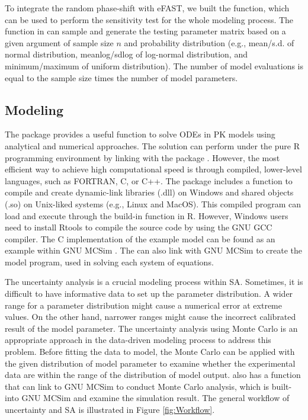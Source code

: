 To integrate the random phase-shift with eFAST, we built the
 function, which can be used to perform the sensitivity
test for the whole modeling process. The function  in
 can sample and generate the testing parameter matrix
based on a given argument of sample size \(n\) and probability
distribution (e.g., mean/s.d. of normal distribution, meanlog/sdlog of
log-normal distribution, and minimum/maximum of uniform distribution).
The number of model evaluations is equal to the sample size times the
number of model parameters.

\hypertarget{modeling}{%
\subsection{Modeling}\label{modeling}}

The  package provides a useful function to solve ODEs
in PK models using analytical and numerical approaches. The solution can
perform under the pure R programming environment by linking
 with the  package \citep{JSSv033i09}.
However, the most efficient way to achieve high computational speed is
through compiled, lower-level languages, such as FORTRAN, C, or C++. The
 package includes a function to compile and create
dynamic-link libraries (.dll) on Windows and shared objects (.so) on
Unix-liked systems (e.g., Linux and MacOS). This compiled program can
load and execute through the build-in function in R. However, Windows
users need to install Rtools to compile the source code by using the GNU
GCC compiler. The C implementation of the example model can be found as
an example within GNU MCSim \citep{bois2009gnu}. The 
can also link with GNU MCSim to create the model program, used in
solving each system of equations.

The uncertainty analysis is a crucial modeling process within SA.
Sometimes, it is difficult to have informative data to set up the
parameter distribution. A wider range for a parameter distribution might
cause a numerical error at extreme values. On the other hand, narrower
ranges might cause the incorrect calibrated result of the model
parameter. The uncertainty analysis using Monte Carlo is an appropriate
approach in the data-driven modeling process to address this problem.
Before fitting the data to model, the Monte Carlo can be applied with
the given distribution of model parameter to examine whether the
experimental data are within the range of the distribution of model
output.  also has a function that can link to GNU MCSim
to conduct Monte Carlo analysis, which is built-into GNU MCSim and
examine the simulation result. The general workflow of uncertainty and
SA is illustrated in Figure \ref{fig:Workflow}.


